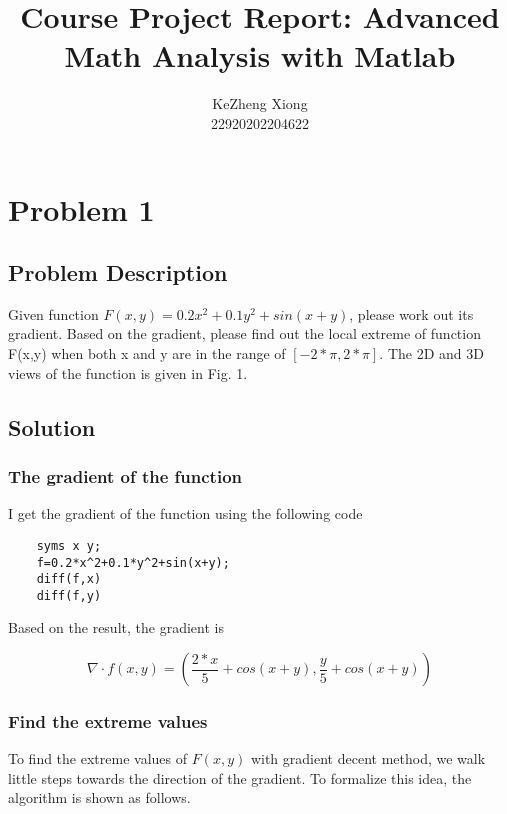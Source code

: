 \documentclass[12pt]{article}
\begin{document}
\title{Course Project Report: Advanced Math Analysis with Matlab}
\author{KeZheng Xiong \\ 22920202204622}

\maketitle

\tableofcontents

\pagebreak

\section{Problem 1}

\subsection{Problem Description}
Given function $F(x, y) = 0.2x^2 + 0.1y^2 + sin(x + y)$, please work out its
gradient. Based on the gradient, please find out the local extreme of function F(x,y)
when both x and y are in the range of $[-2*\pi, 2*\pi]$. The 2D and 3D views of the function
is given in Fig. 1. 

\subsection{Solution}

\subsubsection{The gradient of the function}

I get the gradient of the function using the following code

\begin{lstlisting}
	syms x y;
	f=0.2*x^2+0.1*y^2+sin(x+y);
	diff(f,x)
	diff(f,y)
\end{lstlisting}

Based on the result, the gradient is

\begin{equation}
	\nabla \cdot f(x,y)=( \frac{2*x}{5} + cos(x + y), \frac{y}{5} + cos(x + y))
\end{equation}

\subsubsection{Find the extreme values}
To find the extreme values of $F(x,y)$ with gradient decent method, we walk little steps towards the direction of the gradient. To formalize this idea, the algorithm is shown as follows.
\end{document}
